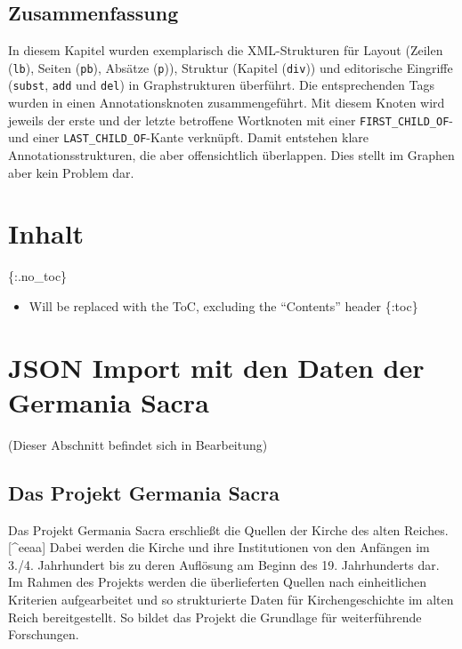 \documentclass[ngerman,]{scrreprt}
\providecommand{\tightlist}{%
  \setlength{\itemsep}{0pt}\setlength{\parskip}{0pt}}
\begin{document}
\section{Zusammenfassung}\label{zusammenfassung-6}

In diesem Kapitel wurden exemplarisch die XML-Strukturen für Layout (Zeilen (\texttt{lb}), Seiten (\texttt{pb}), Absätze (\texttt{p})), Struktur (Kapitel (\texttt{div})) und editorische Eingriffe (\texttt{subst}, \texttt{add} und \texttt{del}) in Graphstrukturen überführt. Die entsprechenden Tags wurden in einen Annotationsknoten zusammengeführt. Mit diesem Knoten wird jeweils der erste und der letzte betroffene Wortknoten mit einer \texttt{FIRST\_CHILD\_OF}- und einer \texttt{LAST\_CHILD\_OF}-Kante verknüpft. Damit entstehen klare Annotationsstrukturen, die aber offensichtlich überlappen. Dies stellt im Graphen aber kein Problem dar.

\chapter{Inhalt}\label{inhalt-8}

\{:.no\_toc\}

\begin{itemize}
\tightlist
\item
  Will be replaced with the ToC, excluding the ``Contents'' header \{:toc\}
\end{itemize}

\chapter{JSON Import mit den Daten der Germania Sacra}\label{json-import-mit-den-daten-der-germania-sacra}

(Dieser Abschnitt befindet sich in Bearbeitung)

\section{Das Projekt Germania Sacra}\label{das-projekt-germania-sacra}

Das Projekt Germania Sacra erschließt die Quellen der Kirche des alten Reiches.{[}\^{}eeaa{]} Dabei werden die Kirche und ihre Institutionen von den Anfängen im 3./4. Jahrhundert bis zu deren Auflösung am Beginn des 19. Jahrhunderts dar. Im Rahmen des Projekts werden die überlieferten Quellen nach einheitlichen Kriterien aufgearbeitet und so strukturierte Daten für Kirchengeschichte im alten Reich bereitgestellt. So bildet das Projekt die Grundlage für weiterführende Forschungen.
\end{document}
